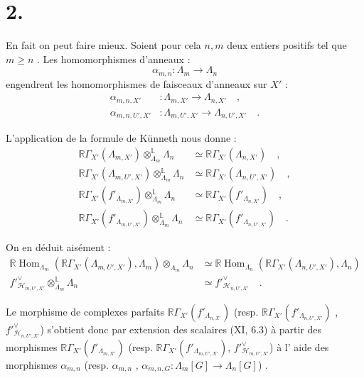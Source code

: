\documentclass[11pt]{article}
\DeclareMathOperator{\Hom}{Hom}
\newcommand{\R}{\mathbb{R}}\newcommand{\RHomCore}{\mathbb{R}\mathrm{Hom}}
\providecommand{\Hom}{\operatorname{Hom}}
\providecommand{\R}{\mathrm R}
\providecommand{\La}{\Lambda}
\providecommand{\Hom}{\operatorname{Hom}}
\begin{document}
\section*{2.}
En fait on peut faire mieux. Soient pour cela $n,m$ deux entiers positifs tel que $m \geq n$ . Les homomorphismes d'anneaux :
\[
\alpha_{m,n} : \La_m \longrightarrow \La_n
\]
engendrent les homomorphismes de faisceaux d'anneaux sur $X'$ :
\begin{align*}
\alpha_{m,n,X'} &: \La_{m,X'} \longrightarrow \La_{n,X'} \quad , \\
\alpha_{m,n,U',X'} &: \La_{m,U',X'} \longrightarrow \La_{n,U',X'} \quad .
\end{align*}

L'application de la formule de Künneth nous donne :
\begin{align}
\tag{2.1} \R\Gamma_{X'}(\La_{m,X'}) \otimes_{\La_m}^{\mathbb{L}} \La_n &\simeq \R\Gamma_{X'}(\La_{n,X'}) \quad , \\
\tag{2.2} \R\Gamma_{X'}(\La_{m,U',X'}) \otimes_{\La_m}^{\mathbb{L}} \La_n &\simeq \R\Gamma_{X'}(\La_{n,U',X'}) \quad , \\
\tag{2.3} \R\Gamma_{X'}(f'_{\La_{m,X'}}) \otimes_{\La_m}^{\mathbb{L}} \La_n &\simeq \R\Gamma_{X'}(f'_{\La_{n,X'}}) \quad , \\
\tag{2.4} \R\Gamma_{X'}(f'_{\La_{m,U',X'}}) \otimes_{\La_m}^{\mathbb{L}} \La_n &\simeq \R\Gamma_{X'}(f'_{\La_{n,U',X'}}) \quad .
\end{align}

On en déduit aisément :
\begin{align}
\tag{2.5} \R\Hom_{\La_m}(\R\Gamma_{X'}(\La_{m,U',X'}), \La_m) \otimes_{\La_m} \La_n &\simeq \R\Hom_{\La_n}(\R\Gamma_{X'}(\La_{n,U',X'}), \La_n) \\
\tag{2.6} f'^\vee_{\mathcal{H}_{m,U',X'}} \otimes_{\La_m}^{\mathbb{L}} \La_n &\simeq f'^\vee_{\mathcal{H}_{n,U',X'}} \quad .
\end{align}

Le morphisme de complexes parfaits $\R\Gamma_{X'}(f'_{\La_{n,X'}})$ (resp. $\R\Gamma_{X'}(f'_{\La_{n,U',X'}})$ , $f'^\vee_{\mathcal{H}_{n,U',X'}}$) s'obtient donc par extension des scalaires (XI, 6.3) à partir des morphismes $\R\Gamma_{X'}(f'_{\La_{m,X'}})$ (resp. $\R\Gamma_{X'}(f'_{\La_{m,U',X'}})$, $f'^\vee_{\mathcal{H}_{m,U',X'}}$) 
à l'%
aide des morphismes $\alpha_{m,n}$ (resp. $\alpha_{m,n}$ , $\alpha_{m,n,G} : \La_m[G] \longrightarrow \La_n[G]$) .
\end{document}
